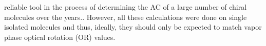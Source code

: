 reliable tool in the process of determining the AC of a large number of chiral molecules over the years.\cite{Kondru99}. 
However, all these calculations were done on single isolated molecules and thus, ideally, they should only be 
expected to match vapor phase optical rotation (OR) values. 
